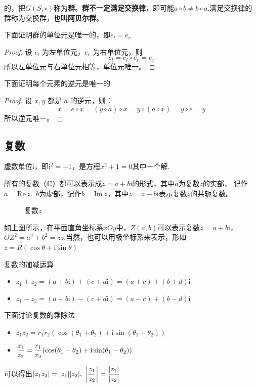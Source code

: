 的，把\(G(S, \circ)\)称为\textbf{群}。\textbf{群不一定满足交换律}，即可能\(a\circ b \ne b \circ a\).满足交换律的群称为交换群，也叫\textbf{阿贝尔群}。

下面证明群的单位元是唯一的，即\(e_l = e_r\)
\begin{proof}
    设 \(e_l\) 为左单位元，\(e_r\) 为右单位元，则
    \[
    e_l = e_l \circ e_r = e_r
    \]
    所以左单位元与右单位元相等，单位元唯一。
\end{proof}

下面证明每个元素的逆元是唯一的
\begin{proof}
    设 \(x, y\) 都是 \(a\) 的逆元，则：
    \[
    x = e \circ x = (y \circ a) \circ x = y \circ (a \circ x) = y \circ e = y
    \]
    所以逆元唯一。
\end{proof}


\subsection{复数}

虚数单位\(\mathrm{i}\)，即\(\mathrm{i}^2=-1\)，是方程\(x^2+1=0\)其中一个解.

所有的复数（\(\mathbb{C}\)）都可以表示成\(z=a+b\mathrm{i}\)的形式，其中\(a\)为复数\(z\)的实部，
记作\(a = \mathrm{Re}\ z\).\ \(b\)为虚部，记作\(b=\mathrm{Im}\ z\)，其中\(\overline{z}=a-b\mathrm{i}\)表示复数\(z\)的共轭复数。
\begin{figure}[H]
    \centering
    \caption{复数\(z\)}
    \label{fig:complex-plane}
\end{figure}

如上图所示，在平面直角坐标系$xOy$中，\(Z(a, b)\)可以表示复数\(z = a + b\mathrm{i}\)，\(OZ^2 = a^2+b^2 = z\overline{z}\).当然，也可以用极坐标系来表示，形如\(z = R(\cos\theta + \mathrm{i}\sin\theta)\)

复数的加减运算
\begin{itemize}
    \item \(z_1 + z_2 = (a+b\mathrm{i}) + (c + d\mathrm{i}) = (a+c)+(b+d)\mathrm{i}\)
    \item \(z_1 - z_2 = (a+b\mathrm{i}) - (c + d\mathrm{i}) = (a-c)+(b-d)\mathrm{i}\)
\end{itemize}

下面讨论复数的乘除法

\begin{itemize}
    \item \(z_1z_2=r_1r_2(\cos(\theta_1+\theta_2) + \mathrm{i}\sin(\theta_1+\theta_2))\)
    \item \(\displaystyle \frac{z_1}{z_2} = \frac{r_1}{r_2}(\cos(\theta_1-\theta_2) + \mathrm{i}\sin(\theta_1-\theta_2))\)
\end{itemize}

可以得出\(\dis |z_1z_2| = |z_1||z_2|,\ \left|\frac{z_1}{z_2}\right| = \frac{|z_1|}{|z_2|}\)

